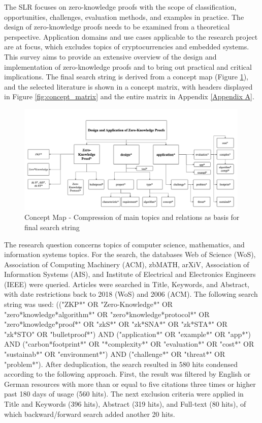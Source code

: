 The SLR focuses on zero-knowledge proofs with the scope of classification, opportunities, challenges, evaluation methods, and examples in practice. The design of zero-knowledge proofs needs to be examined from a theoretical perspective. Application domains and use cases applicable to the research project are at focus, which excludes topics of cryptocurrencies and embedded systems. This survey aims to provide an extensive overview of the design and implementation of zero-knowledge proofs and to bring out practical and critical implications. The final search string is derived from a concept map (Figure \ref{fig:concept_map}), and the selected literature is shown in a concept matrix, with headers displayed in Figure \ref{fig:concept_matrix} and the entire matrix in Appendix \ref{Appendix A}.

\begin{figure}[hbt]
	\centering
		\includegraphics[width=0.99\textwidth]{Pictures/concept map.png}
	\caption{Concept Map - Compression of main topics and relations as basis for final search string}
	\label{fig:concept_map}
\end{figure}

The research question concerns topics of computer science, mathematics, and information systems topics. For the search, the databases Web of Science (WoS), Association of Computing Machinery (ACM), zbMATH, arXiV, Association of Information Systems (AIS), and Institute of Electrical and Electronics Engineers (IEEE) were queried. Articles were searched in Title, Keywords, and Abstract, with date restrictions back to 2018 (WoS) and 2006 (ACM). The following search string was used: (("ZKP*" OR "Zero-Knowledge*" OR "zero*knowledge*algorithm*" OR "zero*knowledge*protocol*" OR "zero*knowledge*proof*" OR "zkS*" OR "zk*SNA*" OR "zk*STA*" OR "zk*STO" OR "bulletproof*") AND ("application*" OR "example*" OR "app*") AND ("carbon*footprint*" OR "*complexity*" OR "evaluation*" OR "cost*" OR "sustainab*" OR "environment*") AND ("challenge*" OR "threat*" OR "problem*"). After deduplication, the search resulted in 580 hits condensed according to the following approach. First, the result was filtered by English or German resources with more than or equal to five citations three times or higher past 180 days of usage (560 hits). The next exclusion criteria were applied in Title and Keywords (396 hits), Abstract (319 hits), and Full-text (80 hits), of which backward/forward search added another 20 hits. 

